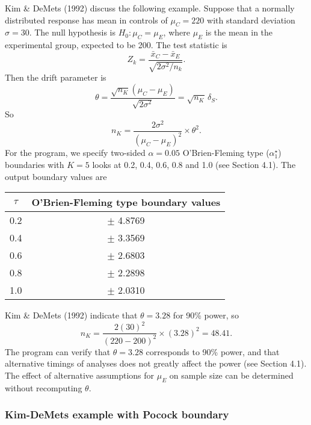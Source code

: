 Kim \& DeMets (1992) discuss the following example.  Suppose that a
normally distributed response has mean in controls of $\mu_C = 220$ with
standard deviation $\sigma = 30$.  The null hypothesis is $H_0: \mu_C
= \mu_E$, where $\mu_E$ is the mean in the experimental group,
expected to be 200.  The test statistic is
\begin{displaymath}
  Z_k = \frac{\bar x_C - \bar x_E}{\sqrt{2 \sigma^2/n_k}}.
\end{displaymath}
Then the drift parameter is
\begin{displaymath}
  \theta =
  \frac{\sqrt{n_K}(\mu_C - \mu_E)}{\sqrt{2\sigma^2}} =
  \sqrt{n_K} \, \delta_S.
\end{displaymath}
So
\begin{displaymath}
  n_K =
  \frac{2 \sigma^2}{(\mu_C - \mu_E)^2} \times \theta^2.
\end{displaymath}
For the program, we specify two-sided $\alpha= 0.05$ O'Brien-Fleming type
($\alpha_1^{\star}$) boundaries with $K = 5$ looks at 0.2, 0.4, 0.6, 0.8
and 1.0 (see Section 4.1).  The output boundary values are
\begin{center}
\begin{tabular}{cc} \hline
\multicolumn{1}{c}{$\tau$}&
\multicolumn{1}{c}{O'Brien-Fleming type boundary values} \\ \hline
 0.2 & $\pm$ 4.8769  \\
 0.4 & $\pm$ 3.3569  \\
 0.6 & $\pm$ 2.6803  \\
 0.8 & $\pm$ 2.2898  \\
 1.0 & $\pm$ 2.0310  \\
\hline
\end{tabular}
\end{center}
Kim \& DeMets (1992) indicate that $\theta = 3.28$ for 90\% power, so
\begin{displaymath}
  n_K = \frac{2(30)^2}{(220-200)^2} \times (3.28)^2 = 48.41.
\end{displaymath}
The program can verify that $\theta = 3.28$ corresponds to 90\% power, and
that alternative timings of analyses does not greatly affect the power (see
Section 4.1).  The effect of alternative assumptions for $\mu_E$ on sample
size can be determined without recomputing $\theta$.


\subsubsection{Kim-DeMets example with Pocock boundary}

